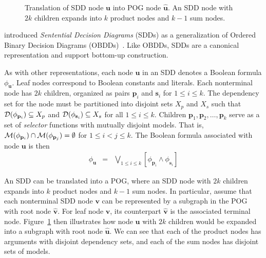 \documentclass[twoside,11pt]{article}
\newcommand{\dependencyset}{{\cal D}}
\newcommand{\modelset}{{\cal M}}
\newcommand{\makenode}[1]{\mathbf{#1}}
\newcommand{\nodeu}{\makenode{u}}
\newcommand{\nodev}{\makenode{v}}
\newcommand{\nodes}{\makenode{s}}
\newcommand{\nodep}{\makenode{p}}
\begin{document}
\begin{figure}
  \begin{center}
    
  \end{center}
\caption{Translation of SDD node $\nodeu$ into POG node $\hat{\nodeu}$.  An SDD node with $2k$ children expands into $k$ product nodes and $k-1$ sum nodes.}
\label{fig:sdd:pog}
\end{figure}

 introduced \emph{Sentential
Decision Diagrams} (SDDs) as a generalization of 
Ordered Binary Decision Diagrams (OBDDs)~\cite{Bryant:1986}.  Like
OBDDs, SDDs are a canonical representation and support bottom-up
construction.

As with other representations, each node $\nodeu$ in an SDD denotes a
Boolean formula $\phi_{\nodeu}$.  Leaf nodes correspond to Boolean constants and literals.
Each nonterminal node has $2k$ children,
organized as pairs $\nodep_i$ and $\nodes_i$ for $1\leq i \leq k$.
The dependency set for the node must be partitioned into disjoint sets $X_p$ and $X_s$ such that
$\dependencyset(\phi_{\nodep_i}) \subseteq X_p$ and
$\dependencyset(\phi_{\nodes_i}) \subseteq X_s$ for all $1 \leq i \leq k$.
Children $\nodep_1, \nodep_2, \ldots, \nodep_k$ serve as a set of
\emph{selector} functions with mutually disjoint models.  That is,
$\modelset(\phi_{\nodep_i}) \cap \modelset(\phi_{\nodep_j}) =
\emptyset$ for $1 \leq i < j \leq k$.
The Boolean formula associated with node $\nodeu$ is then
\begin{eqnarray}
\phi_{\nodeu} & = & \bigvee_{1 \leq i \leq k} \left[\phi_{\nodep_i} \land \phi_{\nodes_i}\right] \label{eqn:sdd}
\end{eqnarray}

An SDD can be translated into a POG, where an SDD node with $2k$
children expands into $k$ product nodes and $k-1$ sum nodes.
In particular, assume that each nonterminal SDD node $\nodev$ can be represented by a
subgraph in the POG with root node $\hat{\nodev}$.  For leaf node $\nodev$, its counterpart $\hat{\nodev}$ is
the associated terminal node.  Figure~\ref{fig:sdd:pog} then
illustrates how node $\nodeu$ with $2k$ children would be expanded
into a subgraph with root node $\hat{\nodeu}$.  We can see that each
of the product nodes has arguments with disjoint dependency sets, and
each of the sum nodes has disjoint sets of models.
\end{document}
